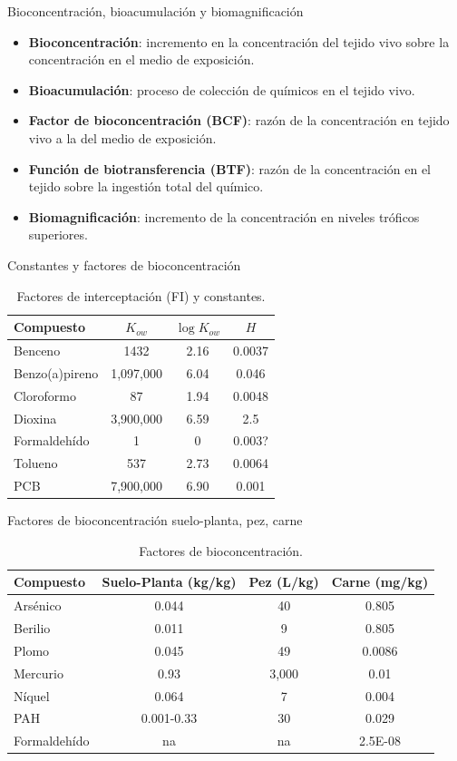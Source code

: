 \documentclass[10pt,compress]{beamer}
\begin{document}
\begin{frame}{Bioconcentración, bioacumulación y biomagnificación}
\begin{itemize}
\item \textbf{Bioconcentración}: incremento en la concentración del tejido vivo sobre la concentración en el medio de exposición.
\item \textbf{Bioacumulación}: proceso de colección de químicos en el tejido vivo.
\item \textbf{Factor de bioconcentración (BCF)}: razón de la concentración en tejido vivo a la del medio de exposición.
\item \textbf{Función de biotransferencia (BTF)}: razón de la concentración en el tejido sobre la ingestión total del químico.
\item \textbf{Biomagnificación}: incremento de la concentración en niveles tróficos superiores.
\end{itemize}
\end{frame}

\begin{frame}{Constantes y factores de bioconcentración}
\begin{table}
\centering
\begin{tabular}{lccc}
\toprule
\textbf{Compuesto} & \(K_{ow}\) & \(\log K_{ow}\) & \(H\) \\
\midrule
Benceno & 1432 & 2.16 & 0.0037 \\
Benzo(a)pireno & 1,097,000 & 6.04 & 0.046 \\
Cloroformo & 87 & 1.94 & 0.0048 \\
Dioxina & 3,900,000 & 6.59 & 2.5 \\
Formaldehído & 1 & 0 & 0.003? \\
Tolueno & 537 & 2.73 & 0.0064 \\
PCB & 7,900,000 & 6.90 & 0.001 \\
\bottomrule
\end{tabular}
\caption{Factores de interceptación (FI) y constantes.}
\end{table}
\end{frame}

\begin{frame}{Factores de bioconcentración suelo-planta, pez, carne}
\begin{table}
\centering
\begin{tabular}{lccc}
\toprule
\textbf{Compuesto} & Suelo-Planta (kg/kg) & Pez (L/kg) & Carne (mg/kg) \\
\midrule
Arsénico & 0.044 & 40 & 0.805 \\
Berilio & 0.011 & 9 & 0.805 \\
Plomo & 0.045 & 49 & 0.0086 \\
Mercurio & 0.93 & 3,000 & 0.01 \\
Níquel & 0.064 & 7 & 0.004 \\
PAH & 0.001-0.33 & 30 & 0.029 \\
Formaldehído & na & na & 2.5E-08 \\
\bottomrule
\end{tabular}
\caption{Factores de bioconcentración.}
\end{table}
\end{frame}
\end{document}
